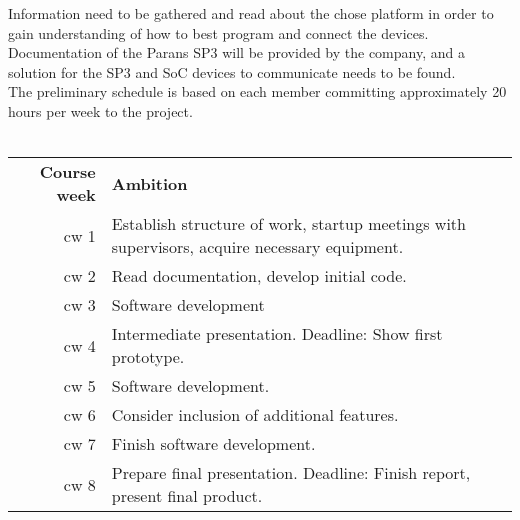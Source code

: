 \documentclass[a4paper]{article}
\begin{document}
		\noindent Information need to be gathered and read about the chose platform in order to gain understanding of how to best program and connect the devices. Documentation of the Parans SP3 will be provided by the company, and a solution for the SP3 and SoC devices to communicate needs to be found. \\
		
		\noindent The preliminary schedule is based on each member committing approximately 20 hours per week to the project.
		\\ \\
		\noindent\begin{tabularx}{\textwidth}{@{}rX}
			\textbf{Course week} & \textbf{Ambition}\\
			cw 1 & Establish structure of work, startup meetings with supervisors, acquire necessary equipment. \\
			cw 2 & Read documentation, develop initial code. \\
			cw 3 & Software development \\
			cw 4 & Intermediate presentation. Deadline: Show first prototype. \\
			cw 5 & Software development. \\
			cw 6 & Consider inclusion of additional features. \\
			cw 7 & Finish software development. \\
			cw 8 & Prepare final presentation. Deadline: Finish report, present final product. \\
		\end{tabularx}
\end{document}
